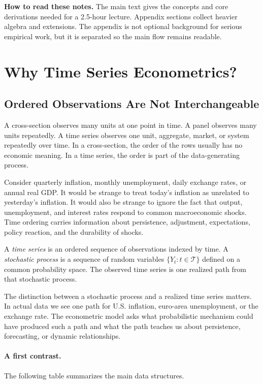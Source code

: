 \begin{boxD}
\textbf{How to read these notes.}
The main text gives the concepts and core derivations needed for a 2.5-hour lecture. Appendix sections collect heavier algebra and extensions. The appendix is not optional background for serious empirical work, but it is separated so the main flow remains readable.
\end{boxD}

\section{Why Time Series Econometrics?}

\subsection{Ordered Observations Are Not Interchangeable}
A cross-section observes many units at one point in time. A panel observes many units repeatedly. A time series observes one unit, aggregate, market, or system repeatedly over time. In a cross-section, the order of the rows usually has no economic meaning. In a time series, the order is part of the data-generating process.

Consider quarterly inflation, monthly unemployment, daily exchange rates, or annual real GDP. It would be strange to treat today's inflation as unrelated to yesterday's inflation. It would also be strange to ignore the fact that output, unemployment, and interest rates respond to common macroeconomic shocks. Time ordering carries information about persistence, adjustment, expectations, policy reaction, and the durability of shocks.

\begin{defN}
A \emph{time series} is an ordered sequence of observations indexed by time. A \emph{stochastic process} is a sequence of random variables $\{Y_t:t\in\mathcal{T}\}$ defined on a common probability space. The observed time series is one realized path from that stochastic process.
\end{defN}

The distinction between a stochastic process and a realized time series matters. In actual data we see one path for U.S. inflation, euro-area unemployment, or the exchange rate. The econometric model asks what probabilistic mechanism could have produced such a path and what the path teaches us about persistence, forecasting, or dynamic relationships.

\paragraph{A first contrast.}
The following table summarizes the main data structures.

